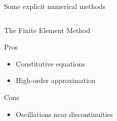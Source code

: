 \begin{withoutheadline}
\begin{frame}{Some explicit numerical methods}
\begin{overprint}
      \begin{columns}
        \begin{column}{0.49\textwidth}
          \vspace{-0.1cm}
          \begin{block}{The Finite Element Method \cite{Belytschko}}
            \begin{footnotesize}
              \begin{block}{\footnotesize Pros}
                \vspace{-0.2cm}
                \begin{itemize}
                \item[] Constitutive equations
                \item[] High-order approximation 
                \end{itemize}
              \end{block}
              \vspace{-0.2cm}
              \begin{block}{\footnotesize Cons}
                \vspace{-0.2cm}
                \begin{itemize}
                \item[] Oscillations near discontinuities
                \end{itemize}
              \end{block}
            \end{footnotesize}
          \end{block}
          

\end{column}
\end{columns}
\end{overprint}
\end{frame}
\end{withoutheadline}

